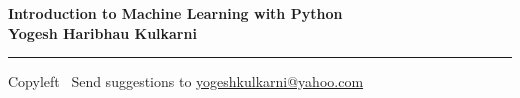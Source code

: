 
\graphicspath{{images/}}

\footnotesize


\begin{center}
\Large{\textbf{Introduction to Machine Learning with Python\\ Yogesh Haribhau Kulkarni}}  
\end{center}

\begin{multicols}{2}

\end{multicols}

\rule{\linewidth}{0.25pt}
\scriptsize
Copyleft \textcopyleft\  Send suggestions to 
\href{http://www.yogeshkulkarni.com}{yogeshkulkarni@yahoo.com}


